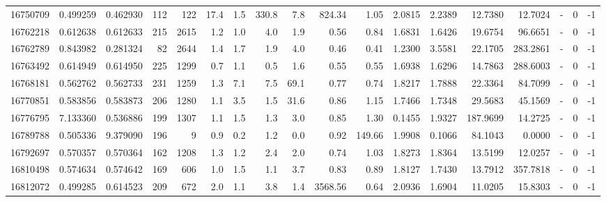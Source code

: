 \begin{tabular}{rrrrrrrrrrrrrrrlrr}
  16750709 & 0.499259 &   0.462930 &  112 &  122 &     17.4 &      1.5 &   330.8 &      7.8 &     824.34 &        1.05 &  2.0815 &  2.2389 &   12.7380 &   12.7024 &             - &        0 &         -1 \\
  16762218 & 0.612638 &   0.612633 &  215 & 2615 &      1.2 &      1.0 &     4.0 &      1.9 &       0.56 &        0.84 &  1.6831 &  1.6426 &   19.6754 &   96.6651 &             - &        0 &         -1 \\
  16762789 & 0.843982 &   0.281324 &   82 & 2644 &      1.4 &      1.7 &     1.9 &      4.0 &       0.46 &        0.41 &  1.2300 &  3.5581 &   22.1705 &  283.2861 &             - &        0 &         -1 \\
  16763492 & 0.614949 &   0.614950 &  225 & 1299 &      0.7 &      1.1 &     0.5 &      1.6 &       0.55 &        0.55 &  1.6938 &  1.6296 &   14.7863 &  288.6003 &             - &        0 &         -1 \\
  16768181 & 0.562762 &   0.562733 &  231 & 1259 &      1.3 &      7.1 &     7.5 &     69.1 &       0.77 &        0.74 &  1.8217 &  1.7888 &   22.3364 &   84.7099 &             - &        0 &         -1 \\
  16770851 & 0.583856 &   0.583873 &  206 & 1280 &      1.1 &      3.5 &     1.5 &     31.6 &       0.86 &        1.15 &  1.7466 &  1.7348 &   29.5683 &   45.1569 &             - &        0 &         -1 \\
  16776795 & 7.133360 &   0.536886 &  199 & 1307 &      1.1 &      1.5 &     1.3 &      3.0 &       0.85 &        1.30 &  0.1455 &  1.9327 &  187.9699 &   14.2725 &             - &        0 &         -1 \\
  16789788 & 0.505336 &   9.379090 &  196 &    9 &      0.9 &      0.2 &     1.2 &      0.0 &       0.92 &      149.66 &  1.9908 &  0.1066 &   84.1043 &    0.0000 &             - &        0 &         -1 \\
  16792697 & 0.570357 &   0.570364 &  162 & 1208 &      1.3 &      1.2 &     2.4 &      2.0 &       0.74 &        1.03 &  1.8273 &  1.8364 &   13.5199 &   12.0257 &             - &        0 &         -1 \\
  16810498 & 0.574634 &   0.574642 &  169 &  606 &      1.0 &      1.5 &     1.1 &      3.7 &       0.83 &        0.89 &  1.8127 &  1.7430 &   13.7912 &  357.7818 &             - &        0 &         -1 \\
  16812072 & 0.499285 &   0.614523 &  209 &  672 &      2.0 &      1.1 &     3.8 &      1.4 &    3568.56 &        0.64 &  2.0936 &  1.6904 &   11.0205 &   15.8303 &             - &        0 &         -1 \\

\end{tabular}
